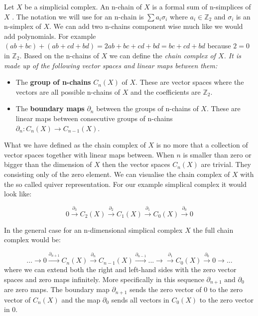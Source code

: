 Let $X$ be a simplicial complex. An n-chain of $X$ is a formal sum of n-simplices of $X$ \cite[p. 79]{comp-topo}. The notation we will use for an n-chain is $\sum{a_i \sigma_i}$ where $a_i \in \mathbb{Z}_2$ and $\sigma_i$ is an n-simplex of $X$. We can add two n-chains component wise much like we would add polynomials. For example $(ab + bc) + (ab + cd + bd) = 2ab + bc + cd + bd = bc + cd + bd$ because $2 = 0$ in $\mathbb{Z}_2$. Based on the n-chains of $X$ we can define the \em chain complex \em of $X$. It is made up of the following vector spaces and linear maps between them:


\begin{itemize}

    \item The \textbf{group of n-chains} $C_n(X)$ of $X$. These are vector spaces where the vectors are all possible n-chains of $X$ and the coefficients are $\mathbb{Z}_2$.

    \item The \textbf{boundary maps} $\partial_n$ between the groups of n-chains of $X$. These are linear maps between consecutive groups of n-chains $\partial_n : C_n(X) \to C_{n-1}(X)$.

\end{itemize}

What we have defined as the chain complex of $X$ is no more that a collection of vector spaces together with linear maps between. When $n$ is smaller than zero or bigger than the dimension of $X$ then the vector spaces $C_n(X)$ are trivial. They consisting only of the zero element. We can visualise the chain complex of $X$ with the so called quiver representation. For our example simplical complex it would look like:

$$ 0 \overset{\partial_{3}}{\longrightarrow} C_2(X) \overset{\partial_{2}}{\longrightarrow} C_{1}(X) \overset{\partial_{1}}{\longrightarrow} C_{0}(X) \overset{\partial_0}{\longrightarrow}  0 $$

In the general case for an n-dimensional simplical complex $X$ the full chain complex would be:

$$ ... \longrightarrow 0 \overset{\partial_{n+1}}{\longrightarrow} C_n(X) \overset{\partial_{n}}{\longrightarrow} C_{n-1}(X) \overset{\partial_{n-1}}{\longrightarrow} ... \longrightarrow  \overset{\partial_1}{\longrightarrow} C_0(X) \overset{\partial_0}{\longrightarrow} 0 \longrightarrow ... $$
where we can extend both the right and left-hand sides with the zero vector spaces and zero maps infinitely. More specifically in this sequence $\partial_{n+1} \text{ and } \partial_{0}$ are zero maps. The boundary map $\partial_{n+1}$ sends the zero vector of $0$ to the zero vector of $C_n(X)$ and the map $\partial_0$ sends all vectors in $C_0(X)$ to the zero vector in $0$.

